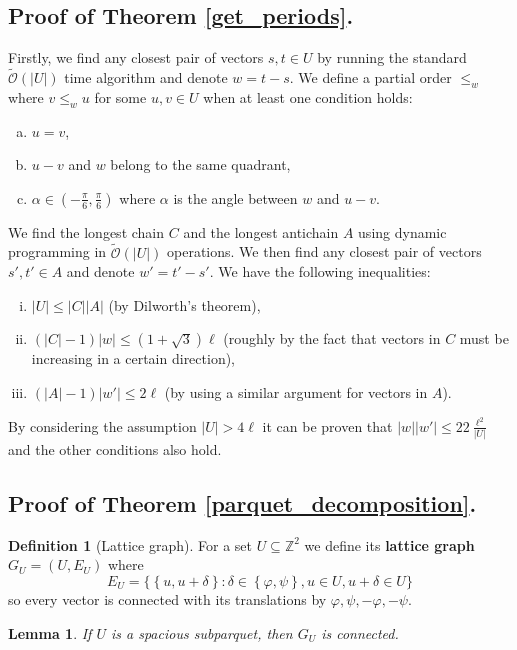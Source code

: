 \documentclass[11pt]{article}
\newcommand{\Z}{\mathbb{Z}}
\newcommand{\tO}{\tilde{\mathcal{O}}}
\renewcommand{\phi}{\varphi}
\newcommand{\set}[1]{\left\lbrace #1 \right\rbrace}
\newcommand{\bigset}[1]{\big \lbrace #1 \big \rbrace}
\theoremstyle{plain}
\newtheorem{lemma}{Lemma}
\theoremstyle{definition}
\newtheorem{definition}{Definition}
\theoremstyle{remark}
\begin{document}
\subsection{Proof of Theorem \ref{get_periods}.}
Firstly, we find any closest pair of vectors $s, t \in U$ by running the standard $\tO(|U|)$ time algorithm and denote $w = t - s$.
We define a partial order $\le_{w}$ where $v \le_w u$ for some $u, v \in U$ when at least one condition holds:
\begin{enumerate}[(a)]
	\item $u = v$,
	\item $u - v$ and $w$ belong to the same quadrant,
	\item $\alpha \in (-\frac{\pi}{6}, \frac{\pi}{6})$ where $\alpha$ is the angle between $w$ and $u - v$.
\end{enumerate}
We find the longest chain $C$ and the longest antichain $A$ using dynamic programming in $\tO(|U|)$ operations.
We then find any closest pair of vectors $s', t' \in A$ and denote $w' = t' - s'$.
We have the following inequalities:
\begin{enumerate}[(i)]
	\item $|U| \le |C| |A|$ (by Dilworth's theorem),
	\item $(|C| - 1) |w| \le (1 + \sqrt{3})\ell$ (roughly by the fact that vectors in $C$ must be increasing in a certain direction), 
	\item $(|A| - 1) |w'| \le 2 \ell$ (by using a similar argument for vectors in $A$).
\end{enumerate}
By considering the assumption $|U| > 4\ell$ it can be proven that $|w||w'| \le 22 \frac{\ell^2}{|U|}$ and the other conditions also hold.


\subsection{Proof of Theorem \ref{parquet_decomposition}.}


\begin{definition}[Lattice graph]
	For a set $U \subseteq \Z^2$ we define its \textbf{lattice graph} $G_U = (U, E_U)$ where
	$$ E_U = \bigset{\set{u, u + \delta} : \delta \in \set{\phi, \psi}, u \in U, u + \delta \in U} $$ 
	so every vector is connected with its translations by $\phi, \psi, -\phi, -\psi$.
\end{definition}


\begin{lemma}
	If $U$ is a spacious subparquet, then $G_U$ is connected.
\end{lemma}
\end{document}
